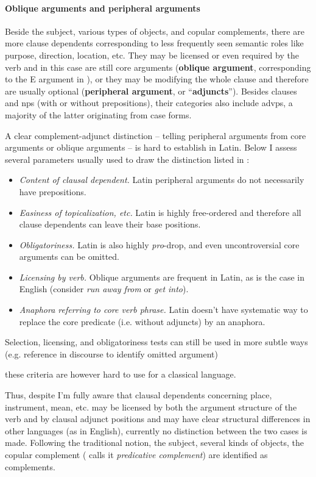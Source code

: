 \documentclass[a4paper, oneside, 12pt]{report}
\newcommand*{\citesec}[1]{\S~{#1}}
\newcommand*{\citepage}[1]{p.~{#1}}
\newcommand*{\concept}[1]{\textbf{#1}}
\newcommand*{\term}[1]{\emph{#1}}
\newcommand{\form}[1]{\emph{#1}}
\begin{document}
\paragraph*{Oblique arguments and peripheral arguments} 
Beside the subject, various types of objects, and copular complements,
there are more clause dependents
corresponding to less frequently seen semantic roles 
like purpose, direction, location, etc.
They may be licensed or even required by the verb 
and in this case are still core arguments
(\concept{oblique argument}, 
corresponding to the E argument in \citet[\citepage{116}]{dixon2010basic2}),
or they may be modifying the whole clause and therefore are usually optional 
(\concept{peripheral argument}, or ``\concept{adjuncts}'').
Besides clauses and \ac{np}s (with or without prepositions),
their categories also include \ac{advp}s,
a majority of the latter originating from case forms.

A clear complement-adjunct distinction 
-- telling peripheral arguments from core arguments or oblique arguments --
is hard to establish in Latin.
Below I assess several parameters usually used to draw the distinction
listed in \citet[\citesec{4.1.2}]{cgel}:
\begin{itemize}
    \item \emph{Content of clausal dependent.} Latin peripheral arguments do not necessarily have prepositions.
    \item \emph{Easiness of topicalization, etc.} Latin is highly free-ordered and therefore all clause dependents 
    can leave their base positions.
    \item \emph{Obligatoriness.} Latin is also highly \term{pro}-drop,
    and even uncontroversial core arguments can be omitted.
    \item \emph{Licensing by verb.} Oblique arguments are frequent in Latin,
    as is the case in English 
    (consider \form{run away from} or \form{get into}).
    \item \emph{Anaphora referring to core verb phrase.} Latin doesn't have systematic way to replace the core predicate (i.e. without adjuncts) by an anaphora.
\end{itemize}
Selection, licensing, and obligatoriness tests 
can still be used in more subtle ways
(e.g. reference in discourse to identify omitted argument)

these criteria are however hard to use for a classical language. 

Thus, despite I'm fully aware that  
clausal dependents concerning place, instrument, mean, etc. 
may be licensed by both the argument structure of the verb 
and by clausal adjunct positions 
and may have clear structural differences in other languages 
(as in English), 
currently no distinction between the two cases is made.
Following the traditional notion,
the subject, several kinds of objects,
the copular complement (\cite{cgel} calls it \term{predicative complement}) 
are identified as complements.
\end{document}
